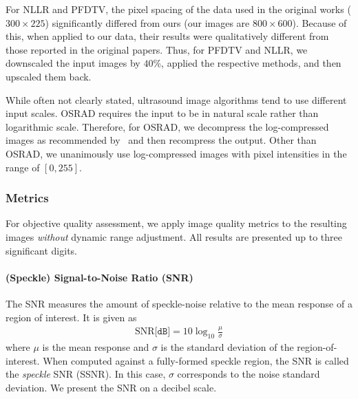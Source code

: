 For NLLR and PFDTV, the pixel spacing of the data used in the original works (\(300 \times 225\)) significantly differed from ours (our images are \(800 \times 600\)).
Because of this, when applied to our data, their results were qualitatively different from those reported in the original papers.
Thus, for PFDTV and NLLR, we downscaled the input images by \(40\%\), applied the respective methods, and then upscaled them back.

While often not clearly stated, ultrasound image algorithms tend to use different input scales.
OSRAD requires the input to be in natural scale rather than logarithmic scale.
Therefore, for OSRAD, we decompress the log-compressed images as recommended by~\cite{yongjianyu_generalized_2004} and then recompress the output.
Other than OSRAD, we unanimously use log-compressed images with pixel intensities in the range of \([0, 255]\).

\subsubsection{Metrics}
For objective quality assessment, we apply image quality metrics to the resulting images \textit{without} dynamic range adjustment.
All results are presented up to three significant digits.

\paragraph{(Speckle) Signal-to-Noise Ratio (SNR)}
The SNR measures the amount of speckle-noise relative to the mean response of a region of interest.
It is given as
\begin{align}
  \mathrm{SNR} \texttt{[dB]} = 10 \log_{10} \frac{\mu}{\sigma}
\end{align}
{\noindent}where \(\mu\) is the mean response and \(\sigma\) is the standard deviation of the region-of-interest.
When computed against a fully-formed speckle region, the SNR is called the \textit{speckle} SNR (SSNR).
In this case, \(\sigma\) corresponds to the noise standard deviation.
We present the SNR on a decibel scale.

